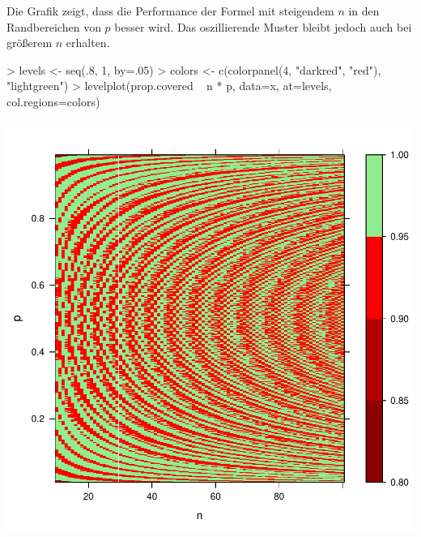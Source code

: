 Die Grafik zeigt, dass die Performance der Formel mit steigendem $n$ in den Randbereichen von $p$ besser wird. Das oszillierende Muster bleibt jedoch auch bei größerem $n$ erhalten.


\begin{Schunk}
\begin{Sinput}
> levels <- seq(.8, 1, by=.05)
> colors <- c(colorpanel(4, "darkred", "red"), "lightgreen")
> levelplot(prop.covered ~ n * p, data=x, 
            at=levels, col.regions=colors)            
\end{Sinput}
\end{Schunk}
\includegraphics{sim_binomial_prop-026}


